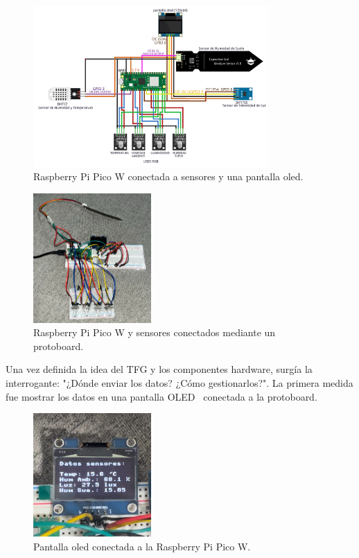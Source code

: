\begin{figure}[h]
	\centering
	\includegraphics[width=0.8\textwidth]{img/diagramas/conexiones_simple.png}
	\caption{Raspberry Pi Pico W conectada a sensores y una pantalla oled.} \label{Img:conexion_simple}
\end{figure}

\begin{figure}[h]
	\centering
	\includegraphics[width=0.4\textwidth]{img/fotos/conexiones_real.png}
	\caption{Raspberry Pi Pico W y sensores conectados mediante un protoboard.} \label{Img:conexion_simple}
\end{figure}

Una vez definida la idea del TFG y los componentes hardware, surgía la interrogante: "¿Dónde enviar los datos? ¿Cómo gestionarlos?". La primera medida fue mostrar los datos en una pantalla OLED~\cite{manual:Oled} conectada a la protoboard.

\begin{figure}[h]
	\centering
	\includegraphics[width=0.4\textwidth]{img/fotos/oled1.png}
	\caption{Pantalla oled conectada a la Raspberry Pi Pico W.} \label{Img:oled_conexion}
\end{figure}

